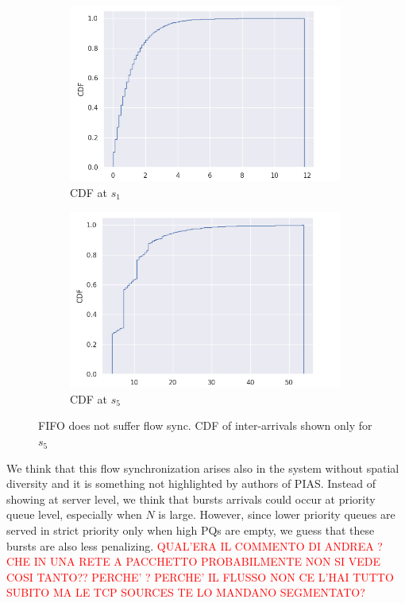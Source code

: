 \begin{figure}
	\centering
	\begin{subfigure}{.45\textwidth}
		\centering
			\includegraphics[width=0.99\textwidth]{Chapter3/Figures/inter_arrival0_FIFO}
		\caption{CDF at $s_1$}
		\label{fig:iatimes-fifo-s1}
	\end{subfigure}%
	\hfill
	\begin{subfigure}{.45\textwidth}
		\centering
		\includegraphics[width=0.99\textwidth]{Chapter3/Figures/inter_arrival4_FIFO}
		\caption{CDF at $s_5$}
		\label{fig:iatimes-fifo-s5}
	\end{subfigure}%
	\caption{FIFO does not suffer flow sync. CDF of inter-arrivals shown only for $s_5$}
	\label{fig:iatimes-fifo}
\end{figure}%

We think that this flow synchronization arises also in the system without spatial diversity and it is something not highlighted by authors of PIAS. Instead of showing at server level, we think that bursts arrivals could occur at priority queue level, especially when $N$ is large. However, since lower priority queues are served in strict priority only when high PQs are empty, we guess that these bursts are also less penalizing. \textcolor{red}{QUAL'ERA IL COMMENTO DI ANDREA ? CHE IN UNA RETE A PACCHETTO PROBABILMENTE NON SI VEDE COSI TANTO?? PERCHE' ? PERCHE' IL FLUSSO NON CE L'HAI TUTTO SUBITO MA LE TCP SOURCES TE LO MANDANO SEGMENTATO?}

